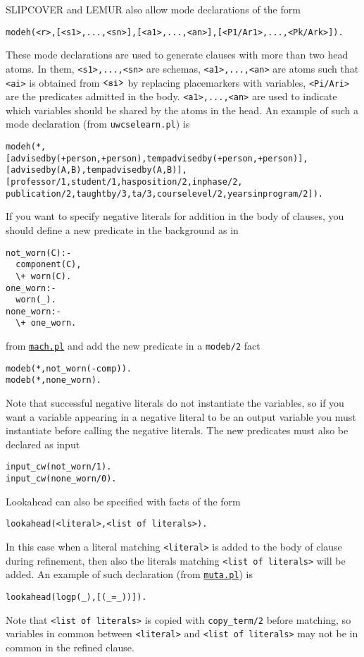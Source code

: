 SLIPCOVER and LEMUR also allow mode declarations of the form
\begin{verbatim}
modeh(<r>,[<s1>,...,<sn>],[<a1>,...,<an>],[<P1/Ar1>,...,<Pk/Ark>]). 
\end{verbatim}
These mode declarations are used to generate clauses with more than two head atoms. In them, \verb|<s1>,...,<sn>| are schemas,  \verb|<a1>,...,<an>| are atoms such that \verb|<ai>| is obtained from $\verb|<si>|$ by replacing placemarkers with variables, 
\verb|<Pi/Ari>| are the predicates admitted in the body. \verb|<a1>,...,<an>| are used to indicate which variables should be shared by the atoms in the head.
An example of such a mode declaration (from \texttt{uwcselearn.pl}) is
\begin{verbatim}
modeh(*,
[advisedby(+person,+person),tempadvisedby(+person,+person)],
[advisedby(A,B),tempadvisedby(A,B)],
[professor/1,student/1,hasposition/2,inphase/2,
publication/2,taughtby/3,ta/3,courselevel/2,yearsinprogram/2]).
\end{verbatim}
%
If you want to specify negative literals for addition in the body of clauses,
you should define a new predicate in the background as in
\begin{verbatim}
not_worn(C):-
  component(C),
  \+ worn(C).
one_worn:-
  worn(_).
none_worn:-
  \+ one_worn.
\end{verbatim}
from \href{http://cplint.eu/example/learning/mach.pl}{\texttt{mach.pl}} and add the new predicate in a \verb|modeb/2| fact
\begin{verbatim}
modeb(*,not_worn(-comp)).
modeb(*,none_worn).
\end{verbatim}
Note that successful negative literals do not instantiate the variables, so if you want
a variable appearing in a negative literal to be an output variable you must instantiate 
before calling the negative literals.
The new predicates must also be declared as input
\begin{verbatim}
input_cw(not_worn/1).
input_cw(none_worn/0).
\end{verbatim}
Lookahead can also be specified with facts of the form
\begin{verbatim}
lookahead(<literal>,<list of literals>).
\end{verbatim}
In this case when a literal matching \verb|<literal>| is added to the body of clause during refinement, then also
the literals matching \verb|<list of literals>| will be added.
An example of such declaration (from \href{http://cplint.eu/example/learning/muta.pl}{\texttt{muta.pl}}) is
\begin{verbatim}
lookahead(logp(_),[(_=_))]).
\end{verbatim}
Note that
\verb|<list of literals>| is copied with \verb|copy_term/2| before matching, so
variables in common between \verb|<literal>| and \verb|<list of literals>|
may not be in common in the refined clause.

